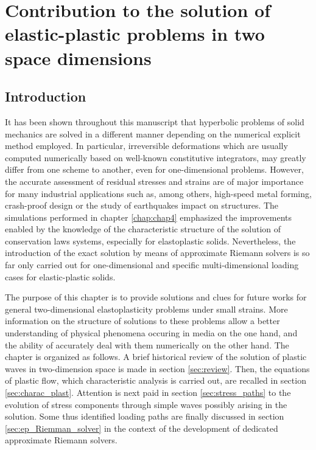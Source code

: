 \chapter{Contribution to the solution of elastic-plastic problems in two space dimensions}

\section*{Introduction}
It has been shown throughout this manuscript that hyperbolic problems of solid mechanics are solved in a different manner depending on the numerical explicit method employed. 
In particular, irreversible deformations which are usually computed numerically based on well-known constitutive integrators, may greatly differ from one scheme to another, even for one-dimensional problems.
However, the accurate assessment of residual stresses and strains are of major importance for many industrial applications such as, among others, high-speed metal forming, crash-proof design or the study of earthquakes impact on structures.
The simulations performed in chapter \ref{chap:chap4} emphasized the improvements enabled by the knowledge of the characteristic structure of the solution of conservation laws systems, especially for elastoplastic solids.
Nevertheless, the introduction of the exact solution by means of approximate Riemann solvers is so far only carried out for one-dimensional and specific multi-dimensional loading cases for elastic-plastic solids.

The purpose of this chapter is to provide solutions and clues for future works for general two-dimensional elastoplasticity problems under small strains. 
More information on the structure of solutions to these problems allow a better understanding of physical phenomena occuring in media on the one hand, and the ability of accurately deal with them numerically on the other hand.
The chapter is organized as follows.
A brief historical review of the solution of plastic waves in two-dimension space is made in section \ref{sec:review}.
Then, the equations of plastic flow, which characteristic analysis is carried out, are recalled in section \ref{sec:charac_plast}.
Attention is next paid in section \ref{sec:stress_paths} to the evolution of stress components through simple waves possibly arising in the solution. 
Some thus identified loading paths are finally discussed in section \ref{sec:ep_Riemman_solver} in the context of the development of dedicated approximate Riemann solvers. 

